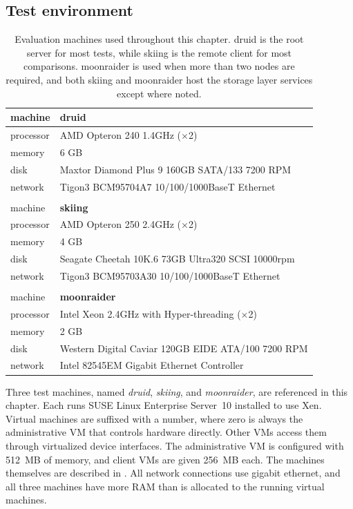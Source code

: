 \subsection{Test environment}

\begin{table}[t]
\begin{center}
\begin{tabular}{l|l}
machine      & \textbf{druid} \\ \hline
processor    & AMD Opteron 240 1.4GHz ($\times$2) \\
memory       & 6 GB \\
disk         & Maxtor Diamond Plus 9 160GB SATA/133 7200 RPM \\
network      & Tigon3 BCM95704A7 10/100/1000BaseT Ethernet \\
& \\
machine      & \textbf{skiing} \\ \hline
processor    & AMD Opteron 250 2.4GHz ($\times$2) \\
memory       & 4 GB \\
disk         & Seagate Cheetah 10K.6 73GB Ultra320 SCSI 10000rpm \\
network      & Tigon3 BCM95703A30 10/100/1000BaseT Ethernet \\
& \\
machine      & \textbf{moonraider} \\ \hline
processor    & Intel Xeon 2.4GHz with Hyper-threading ($\times$2) \\
memory       & 2 GB \\
disk         & Western Digital Caviar 120GB EIDE ATA/100 7200 RPM \\
network      & Intel 82545EM Gigabit Ethernet Controller
\end{tabular}
\end{center}
\caption[Machines used in the evaluation]{Evaluation machines used throughout this chapter. druid is the root server for most tests, while skiing is the remote client for most comparisons. moonraider is used when more than two nodes are required, and both skiing and moonraider host the storage layer services except where noted.}
\label{tab:hardware}
\end{table}

Three test machines, named \emph{druid}, \emph{skiing}, and \emph{moonraider}, are referenced in this chapter. Each runs SUSE Linux Enterprise Server~10 installed to use Xen. Virtual machines are suffixed with a number, where zero is always the administrative VM that controls hardware directly. Other VMs access them through virtualized device interfaces. The administrative VM is configured with 512~MB of memory, and client VMs are given 256~MB each. The machines themselves are described in . All network connections use gigabit ethernet, and all three machines have more RAM than is allocated to the running virtual machines.

